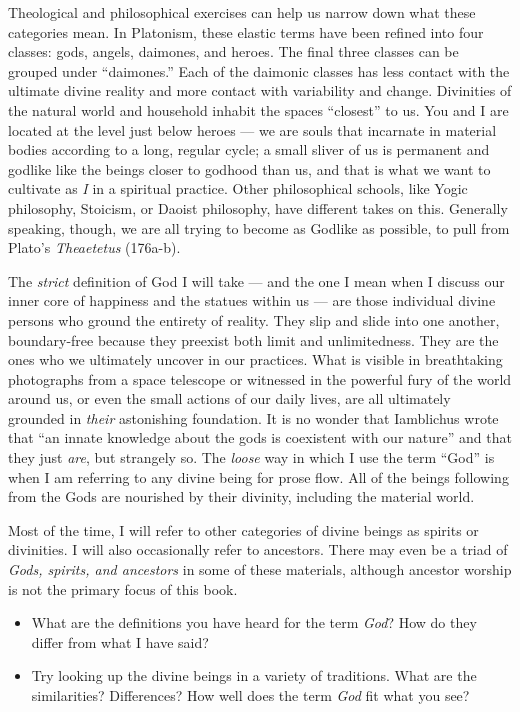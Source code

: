 \documentclass[
]{book}
\begin{document}
Theological and philosophical exercises can help us narrow down what these categories mean. In Platonism, these elastic terms have been refined into four classes: gods, angels, daimones, and heroes. The final three classes can be grouped under ``daimones.'' Each of the daimonic classes has less contact with the ultimate divine reality and more contact with variability and change. Divinities of the natural world and household inhabit the spaces ``closest'' to us. You and I are located at the level just below heroes --- we are souls that incarnate in material bodies according to a long, regular cycle; a small sliver of us is permanent and godlike like the beings closer to godhood than us, and that is what we want to cultivate as \emph{I} in a spiritual practice. Other philosophical schools, like Yogic philosophy, Stoicism, or Daoist philosophy, have different takes on this. Generally speaking, though, we are all trying to become as Godlike as possible, to pull from Plato's \emph{Theaetetus} (176a-b).

The \emph{strict} definition of God I will take --- and the one I mean when I discuss our inner core of happiness and the statues within us --- are those individual divine persons who ground the entirety of reality. They slip and slide into one another, boundary-free because they preexist both limit and unlimitedness. They are the ones who we ultimately uncover in our practices. What is visible in breathtaking photographs from a space telescope or witnessed in the powerful fury of the world around us, or even the small actions of our daily lives, are all ultimately grounded in \emph{their} astonishing foundation. It is no wonder that Iamblichus wrote that ``an innate knowledge about the gods is coexistent with our nature'' and that they just \emph{are}, but strangely so. The \emph{loose} way in which I use the term ``God'' is when I am referring to any divine being for prose flow. All of the beings following from the Gods are nourished by their divinity, including the material world.

Most of the time, I will refer to other categories of divine beings as spirits or divinities. I will also occasionally refer to ancestors. There may even be a triad of \emph{Gods, spirits, and ancestors} in some of these materials, although ancestor worship is not the primary focus of this book.

\begin{itemize}
\item
  What are the definitions you have heard for the term \emph{God}? How do they differ from what I have said?
\item
  Try looking up the divine beings in a variety of traditions. What are the similarities? Differences? How well does the term \emph{God} fit what you see?
\end{itemize}
\end{document}
